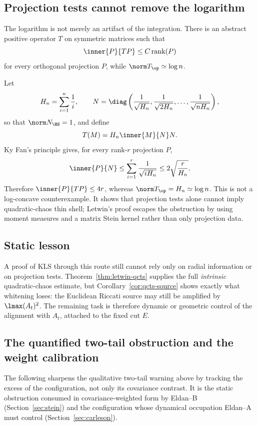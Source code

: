 \documentclass[../../main.tex]{subfiles}
\begin{document}
\subsection{Projection tests cannot remove the logarithm}

The logarithm is not merely an artifact of the integration. There is an abstract positive operator
$T$ on symmetric matrices such that
\[
  \inner{P}{TP}\le C\operatorname{rank}(P)
\]
for every orthogonal projection $P$, while $\norm T_{\op}\simeq\log n$.

Let
\[
  H_n=\sum_{i=1}^n\frac1i,
  \qquad
  N=\diag\left(\frac1{\sqrt{H_n}},\frac1{\sqrt{2H_n}},\ldots,\frac1{\sqrt{nH_n}}\right),
\]
so that $\norm N_{\HS}=1$, and define
\[
  T(M)=H_n\inner{M}{N}N.
\]
Ky Fan's principle gives, for every rank-$r$ projection $P$,
\[
  \inner{P}{N}\le\sum_{i=1}^r\frac1{\sqrt{iH_n}}\le2\sqrt{\frac r{H_n}}.
\]
Therefore $\inner{P}{TP}\le4r$, whereas $\norm T_{\op}=H_n\simeq\log n$. This is not a log-concave
counterexample. It shows that projection tests alone cannot imply quadratic-chaos thin shell;
Letwin's proof escapes the obstruction by using moment measures and a matrix Stein kernel rather
than only projection data.

\subsection{Static lesson}

A proof of KLS through this route still cannot rely only on radial information or on projection
tests. Theorem~\ref{thm:letwin-qcts} supplies the full \emph{intrinsic} quadratic-chaos estimate,
but Corollary~\ref{cor:qcts-source} shows exactly what whitening loses: the Euclidean Riccati
source may still be amplified by $\lmax(A_t)^2$. The remaining task is therefore dynamic or
geometric control of the alignment with $A_t$, attached to the fixed cut $E$.

\subsection{The quantified two-tail obstruction and the weight calibration}

The following sharpens the qualitative two-tail warning above by tracking the excess of the
configuration, not only its covariance contrast. It is the static obstruction consumed in
covariance-weighted form by Eldan--B (Section~\ref{sec:stein}) and the configuration whose
dynamical occupation Eldan--A must control (Section~\ref{sec:carleson}).
\end{document}
